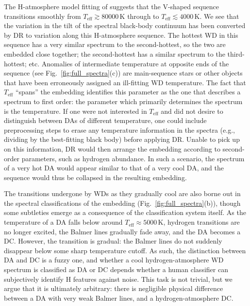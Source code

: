 \documentclass[fleqn,usenatbib]{mnras}
\def\Teff{T_\mathrm{eff}}
\begin{document}
The H-atmosphere model fitting of \citet{gentilefusillo19} suggests that the V-shaped sequence transitions smoothly from $\Teff \gtrsim 80000\,\text{K}$ through to $\Teff \lesssim 4000\,\text{K}$.
We see that the variation in the tilt of the spectral black-body continuum has been converted by DR to variation along this H-atmosphere sequence.
The hottest WD in this sequence has a very similar spectrum to the second-hottest, so the two are embedded close together; the second-hottest has a similar spectrum to the third-hottest; etc.
Anomalies of intermediate temperature at opposite ends of the sequence (see Fig.~\ref{fig:full_spectra}(c)) are main-sequence stars or other objects that have been erroneously assigned an ill-fitting WD temperature.
The fact that $\Teff$ ``spans'' the embedding identifies this parameter as the one that describes a spectrum to first order: the parameter which primarily determines the spectrum is the temperature.
If one were not interested in $\Teff$ and did not desire to distinguish between DAs of different temperature, one could include preprocessing steps to erase any temperature information in the spectra (e.g., dividing by the best-fitting black body) before applying DR.
Unable to pick up on this information, DR would then arrange the embedding according to second-order parameters, such as hydrogen abundance.
In such a scenario, the spectrum of a very hot DA would appear similar to that of a very cool DA, and the sequence would thus be collapsed in the resulting embedding.

The transitions undergone by WDs as they gradually cool are also borne out in the spectral classifications of the embedding (Fig.~\ref{fig:full_spectra}(b)), though some subtleties emerge as a consequence of the classification system itself.
As the temperature of a DA falls below around $\Teff\approx 5000\,\text{K}$, hydrogen transitions are no longer excited, the Balmer lines gradually fade away, and the DA becomes a DC.
However, the transition is gradual: the Balmer lines do not suddenly disappear below some sharp temperature cutoff.
As such, the distinction between DA and DC is a fuzzy one, and whether a cool hydrogen-atmosphere WD spectrum is classified as DA or DC depends whether a human classifier can subjectively identify H features against noise.
This task is not trivial, but we argue that it is ultimately arbitrary: there is negligible physical difference between a DA with very weak Balmer lines, and a hydrogen-atmosphere DC.

\end{document}
